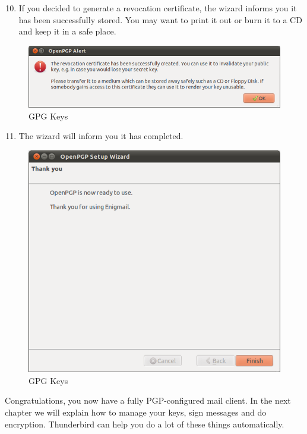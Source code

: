 \begin{enumerate}[1.]
\setcounter{enumi}{9}
\item
  If you decided to generate a revocation certificate, the wizard
  informs you it has been successfully stored. You may want to print it
  out or burn it to a CD and keep it in a safe place.
\end{enumerate}
\begin{figure}[htbp]
\centering
\includegraphics{gpg_keys_10.png}
\caption{GPG Keys}
\end{figure}

\begin{enumerate}[1.]
\setcounter{enumi}{10}
\item
  The wizard will inform you it has completed.
\end{enumerate}
\begin{figure}[htbp]
\centering
\includegraphics{gpg_keys_11.png}
\caption{GPG Keys}
\end{figure}

Congratulations, you now have a fully PGP-configured mail client. In the
next chapter we will explain how to manage your keys, sign messages and
do encryption. Thunderbird can help you do a lot of these things
automatically.
